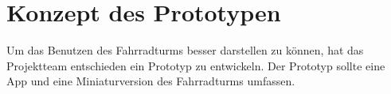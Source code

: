 \section{Konzept des Prototypen}

Um das Benutzen des Fahrradturms besser darstellen zu können, hat das Projektteam entschieden ein Prototyp zu entwickeln. Der Prototyp sollte eine App und eine Miniaturversion des Fahrradturms umfassen.





